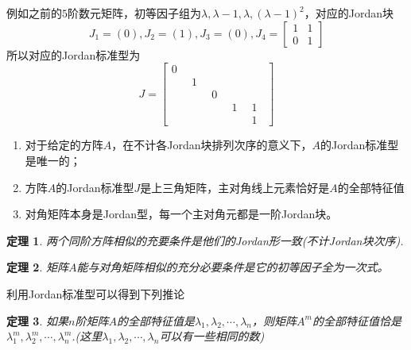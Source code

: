\documentclass[a4paper,11pt]{article}
\newtheorem{theorem}{\hspace{2em}定理}[section]
\begin{document}
    例如之前的$5$阶数元矩阵，初等因子组为$\lambda,\lambda-1,\lambda,(\lambda-1)^2$，对应的Jordan块
    \begin{equation*}
        J_1=(0),J_2=(1),J_3=(0),J_4=\begin{bmatrix}
            1&1\\
            0&1
        \end{bmatrix}
    \end{equation*}
    所以对应的Jordan标准型为
    \begin{equation*}
        J=\begin{bmatrix}
            0&\quad&\quad&\quad&\quad\\
            \quad&1&\quad&\quad&\quad\\
            \quad&\quad&0&\quad&\quad\\
            \quad&\quad&\quad&1&1\\
            \quad&\quad&\quad&\quad&1
        \end{bmatrix}
    \end{equation*}
    \begin{enumerate}
        \item 对于给定的方阵$A$，在不计各Jordan块排列次序的意义下，$A$的Jordan标准型是唯一的；
        \item 方阵$A$的Jordan标准型$J$是上三角矩阵，主对角线上元素恰好是$A$的全部特征值
        \item 对角矩阵本身是Jordan型，每一个主对角元都是一阶Jordan块。
    \end{enumerate}
    \begin{theorem}
        两个同阶方阵相似的充要条件是他们的Jordan形一致(不计Jordan块次序).
    \end{theorem}
    \begin{theorem}
        矩阵$A$能与对角矩阵相似的充分必要条件是它的初等因子全为一次式。
    \end{theorem}
    利用Jordan标准型可以得到下列推论
    \begin{theorem}
        如果$n$阶矩阵$A$的全部特征值是$\lambda_1,\lambda_2,\cdots,\lambda_n$，则矩阵$A^m$的全部特征值恰是$\lambda_1^m,\lambda_2^m,\cdots,\lambda_n^m$.(这里$\lambda_1,\lambda_2,\cdots,\lambda_n$可以有一些相同的数)
    \end{theorem}
\end{document}
